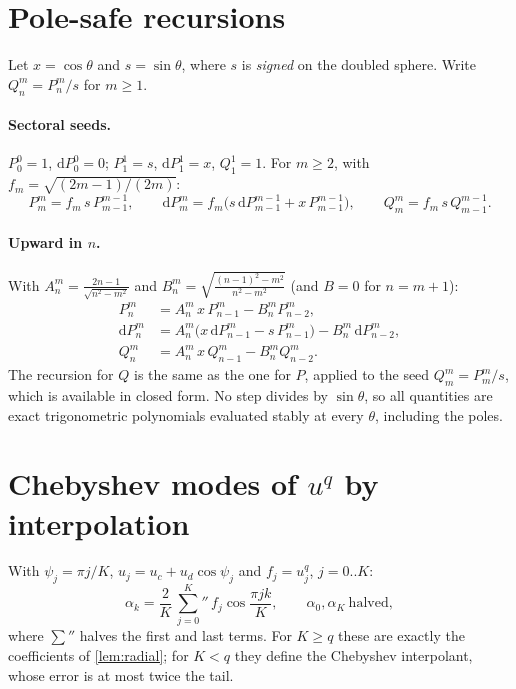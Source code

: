 \documentclass[11pt,a4paper]{article}
\theoremstyle{remark}
\begin{document}
\appendix
\section{Pole-safe recursions}\label{app:recursions}
Let $x=\cos\theta$ and $s=\sin\theta$, where $s$ is \emph{signed} on the doubled sphere. Write $Q_n^m=P_n^m/s$ for $m\ge1$.

\paragraph{Sectoral seeds.} $P_0^0=1$, $\mathrm dP_0^0=0$; $P_1^1=s$, $\mathrm dP_1^1=x$, $Q_1^1=1$. For $m\ge2$, with $f_m=\sqrt{(2m-1)/(2m)}$:
\[
P_m^m=f_m\,s\,P_{m-1}^{m-1},\qquad
\mathrm dP_m^m=f_m\big(s\,\mathrm dP_{m-1}^{m-1}+x\,P_{m-1}^{m-1}\big),\qquad
Q_m^m=f_m\,s\,Q_{m-1}^{m-1}.
\]
\paragraph{Upward in $n$.} With $A_n^m=\frac{2n-1}{\sqrt{n^2-m^2}}$ and $B_n^m=\sqrt{\frac{(n-1)^2-m^2}{n^2-m^2}}$ (and $B=0$ for $n=m+1$):
\begin{align*}
P_n^m&=A_n^m\,x\,P_{n-1}^m-B_n^mP_{n-2}^m,\\
\mathrm dP_n^m&=A_n^m\big(x\,\mathrm dP_{n-1}^m-s\,P_{n-1}^m\big)-B_n^m\,\mathrm dP_{n-2}^m,\\
Q_n^m&=A_n^m\,x\,Q_{n-1}^m-B_n^mQ_{n-2}^m.
\end{align*}
The recursion for $Q$ is the same as the one for $P$, applied to the seed $Q_m^m=P_m^m/s$, which is available in closed
form. No step divides by $\sin\theta$, so all quantities are exact trigonometric polynomials
evaluated stably at every $\theta$, including the poles.

\section{Chebyshev modes of \texorpdfstring{$u^q$}{u^q} by interpolation}
With $\psi_j=\pi j/K$, $u_j=u_c+u_d\cos\psi_j$ and $f_j=u_j^q$, $j=0..K$:
\[
\alpha_k=\frac{2}{K}\,{\sum_{j=0}^{K}}{}''\,f_j\cos\frac{\pi jk}{K},\qquad
\alpha_0,\alpha_K\ \text{halved},
\]
where $\sum''$ halves the first and last terms. For $K\ge q$ these are exactly the coefficients of
\cref{lem:radial}; for $K<q$ they define the Chebyshev interpolant, whose error is at most twice the tail.
\end{document}
